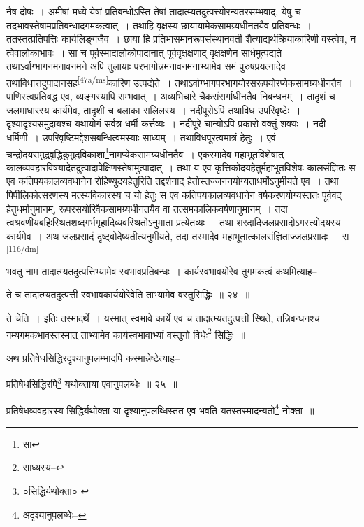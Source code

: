 \documentclass[article,12pt,a4paper]{memoir}
\begin{document}
	  \pstart नैष दोषः । अमीषां मध्ये येषां प्रतिबन्धोऽस्ति तेषां तादात्म्यतदुत्पत्त्योरन्यतरसम्भवाद्, येषु च तदभावस्तेषामप्रतिबन्धादगमकत्वात् । तथाहि वृक्षस्य छायायामेकसामग्र्यधीनतयैव प्रतिबन्धः । ततस्तत्प्रतिपत्तिः कार्यलिङ्गजैव । छाया हि प्रतिभासमानरूपसंस्थानवती शैत्याद्यर्थक्रियाकारिणी वस्त्वेव, न त्वेवालोकाभावः । सा च पूर्वस्मादालोकोपादानात् पूर्ववृक्षक्षणाद् वृक्षक्षणेन सार्धमुत्पद्यते । तथाऽर्वाग्भागनमनावनमने अपि तुलायाः परभागोन्नमनावनमनाभ्यामेव समं पुरुषप्रयत्नादेव तथाविधात्तदुपादानसह\leavevmode\textsuperscript{\rmlatinfont\tiny [47a/ms]}कारिण उत्पद्येते । तथाऽर्वाग्भागपरभागयोरसरूपयोरप्येकसामग्र्यधीनतैव । पाणिस्त्वप्रतिबद्ध एव, व्यङ्गस्यापि सम्भवात् । अव्यभिचारे चैकसंसर्गाधीनतैव निबन्धनम् । तादृशं च जलमाधारस्य कार्यमेव, तादृशी च बलाका सलिलस्य । नदीपूरोऽपि तथाविध उपरिवृष्टेः । दृश्यादृश्यसमुदायश्च यथायोगं सर्वत्र धर्मी कर्त्तव्यः । नदीपूरे चान्योऽपि प्रकारो वक्तुं शक्यः । नदी धर्मिणी । उपरिवृष्टिमद्देशसबन्धित्वमस्याः साध्यम् । तथाविधपूरत्वमात्रं हेतुः । एवं चन्द्रोदयसमुद्रवृद्धिकुमुदविकाशा\footnote{सा}नामप्येकसामग्र्यधीनतैव । एकस्मादेव महाभूतविशेषात् कालव्यवहारविषयादेतदुत्पादापेक्षिणस्तेषामुत्पादात् । तथा य एव कृत्तिकोदयहेतुर्महाभूतविशेषः कालसंज्ञितः स एव कतिपयकालव्यवधानेन रोहिण्युदयहेतुरिति तद्दर्शनाद् हेतोस्तज्जननयोग्यताधर्मोऽनुमीयते एव । तथा पिपीलिकोत्सरणस्य मत्स्यविकारस्य च यो हेतुः स एव कतिपयकालव्यवधानेन वर्षकरणयोग्यस्ततः पूर्ववद् हेतुधर्मानुमानम्, रूपरसयोरिवैकसामग्र्यधीनतयैव वा तत्समकालिकवर्षणानुमानम् । तदा त्वश्रवणीयबहिःस्थितशब्दगर्भगृहादिव्यवस्थितोऽनुमाता प्रत्येतव्यः । तथा शरदादिजलप्रसादोऽगस्त्योदयस्य कार्यमेव । अथ जलप्रसादं दृष्ट्वोदेष्यतीत्यनुमीयते, तदा तस्मादेव महाभूतात्कालसंज्ञिताज्जलप्रसादः । स \leavevmode\textsuperscript{\rmlatinfont\tiny [116/dm]} 
	  
	भवतु नाम तादात्म्यतदुत्पत्तिभ्यामेव स्वभावप्रतिबन्धः । कार्यस्वभावयोरेव तुगमकत्वं कथमित्याह-- 
	  
	ते च तादात्म्यतदुत्पत्ती स्वभावकार्ययोरेवेति ताभ्यामेव वस्तुसिद्धिः ॥ २४ ॥ 
	  
	ते चेति । इतिः तस्मादर्थे । यस्मात् स्वभावे कार्ये एव च तादात्म्यतदुत्पत्ती स्थिते, तन्निबन्धनश्च गम्यगमकभावस्तस्मात् ताभ्यामेव कार्यस्वभावाभ्यां वस्तुनो विधेः\footnote{साध्यस्य--\cite{dp-msD-n}} सिद्धिः ॥ 
	  
	अथ प्रतिषेधसिद्धिरदृश्यानुपलम्भादपि कस्मान्नेष्टेत्याह-- 
	  
	प्रतिषेधसिद्धिरपि\footnote{०सिद्धिर्यथोक्ता० \cite{dp-edE}} यथोक्ताया एवानुपलब्धेः ॥ २५ ॥ 
	  
	प्रतिषेधव्यवहारस्य सिद्धिर्यथोक्ता या दृश्यानुपलब्धिस्तत एव भवति यतस्तस्मादन्यतो\footnote{अदृश्यानुपलब्धेः--\cite{dp-msD-n}} नोक्ता ॥ 
	  
\end{document}
